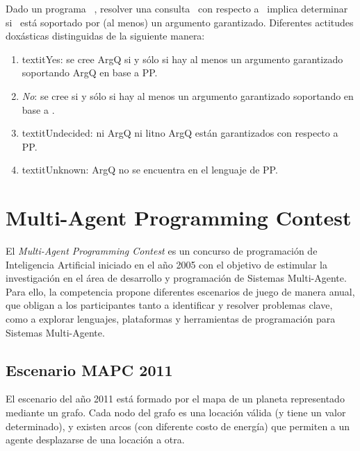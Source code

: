  Dado un programa \DLP\ \PP, resolver una consulta \ArgQ\ con respecto
 a \PP\ implica determinar si \ArgQ\ está soportado por (al menos) un
 argumento garantizado. Diferentes actitudes doxásticas %
 distinguidas de la siguiente manera:
 
 \begin{enumerate}[(1)]
 
 \item textit{Yes}: se cree ArgQ si y sólo si hay al menos un argumento
 garantizado soportando ArgQ en base a PP.
 
 \item \textit{No}: se cree \lit{\no \ArgQ} si y sólo si hay al menos
 un argumento garantizado  soportando \lit{\no \ArgQ} en base a \PP.
 
 \item textit{Undecided}: ni ArgQ ni lit{no ArgQ} están garantizados
 con respecto a PP.
 
 \item textit{Unknown}: ArgQ no se encuentra en el lenguaje de PP.
 
 \end{enumerate}

\section{Multi-Agent Programming Contest}
 \label{sec:mapc}

 El \textit{Multi-Agent Programming Contest} es un concurso de
 programación de Inteligencia Artificial iniciado en el año 2005 con el
 objetivo de estimular la investigación en el área de desarrollo y
 programación de Sistemas Multi-Agente.
 Para ello, la competencia propone diferentes escenarios de juego de
 manera anual, que obligan a los participantes tanto a identificar y
 resolver problemas clave, como a explorar lenguajes, plataformas y
 herramientas de programación para Sistemas Multi-Agente.

\subsection{Escenario MAPC 2011}
 \label{sub:escenario_mapc}

 El escenario del año 2011 está formado por el mapa de un planeta
 representado mediante un grafo.
 Cada nodo del grafo es una locación válida (y tiene un valor
 determinado), y existen arcos (con diferente costo de energía) que
 permiten a un agente desplazarse de una locación a otra.
 
